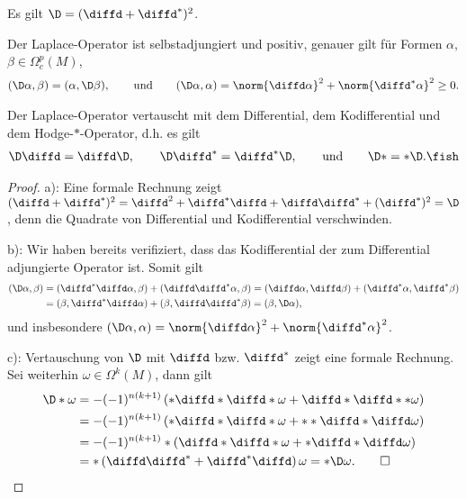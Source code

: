 \documentclass[%
	paper=a5,%
	fleqn,%
	DIV=18,%
	BCOR=0mm,
	fontsize=11pt,
	titlepage=false,%
	bibliography=totoc,
	DIV=18,%
	twoside=true,
	pdftitle=Riemannsche Geometrie,
	pdfauthor=Uwe Semmelmann,
	numbers=noendperiod]%
	{scrbook}
\begin{document}
\begin{lem}
\begin{propenum}
\item Es gilt $\D = (\diffd + \diffd^*)^2$.
\item Der Laplace-Operator ist selbstadjungiert und positiv, genauer gilt für Formen $\alpha$, $\beta\in \Omega^p_{c}(M)$,
\begin{align*}
(\D \alpha,\beta) = (\alpha,\D\beta),\qquad \text{und} \qquad (\D\alpha,\alpha) = \norm{\diffd\alpha}^2 + \norm{\diffd^*\alpha}^2 \ge 0.
\end{align*}
\item Der Laplace-Operator vertauscht mit dem Differential, dem Kodifferential und dem Hodge-$*$-Operator, d.h. es gilt
\begin{align*}
\D\diffd = \diffd\D,\qquad \D\diffd^* = \diffd^* \D,\qquad\text{und}\qquad \D* = *\D. \fish
\end{align*}
\end{propenum}
\end{lem}
\begin{proof}
a): Eine formale Rechnung zeigt $(\diffd + \diffd^*)^2 = \diffd^2+ \diffd^*\diffd + \diffd\diffd^*  + (\diffd^*)^2=\D$, denn die Quadrate von Differential und Kodifferential verschwinden.

b): Wir haben bereits verifiziert, dass das Kodifferential der zum Differential adjungierte Operator ist. Somit gilt
\begin{align*}
(\D\alpha,\beta)  &=(\diffd^*\diffd\alpha,\beta) + 
(\diffd\diffd^*\alpha,\beta) = 
(\diffd \alpha,\diffd\beta) + (\diffd^*\alpha,\diffd^*\beta) \\ &= 
(\beta,\diffd^*\diffd\alpha) + (\beta,\diffd\diffd^*\beta) = 
(\beta,\D\alpha),
\end{align*}
und insbesondere $(\D\alpha,\alpha) = \norm{\diffd\alpha}^2 + \norm{\diffd^*\alpha}^2$.

c): Vertauschung von $\D$ mit $\diffd$ bzw. $\diffd^*$ zeigt eine formale Rechnung. Sei weiterhin $\omega\in\Omega^k(M)$, dann gilt
\begin{align*}
\D*\omega &= -(-1)^{n(k+1)}\left(*\diffd*\diffd*\omega + 
\diffd*\diffd**\omega\right)\\
&= -(-1)^{n(k+1)}\left(*\diffd*\diffd*\omega + 
**\diffd*\diffd\omega\right)\\
&= -(-1)^{n(k+1)}*\left(\diffd * \diffd*\omega + *\diffd  *\diffd \omega\right)\\
&=*\left(\diffd\diffd^* + \diffd^*\diffd\right)\omega = 
*\D\omega.\qed
\end{align*}
\end{proof}
\end{document}
